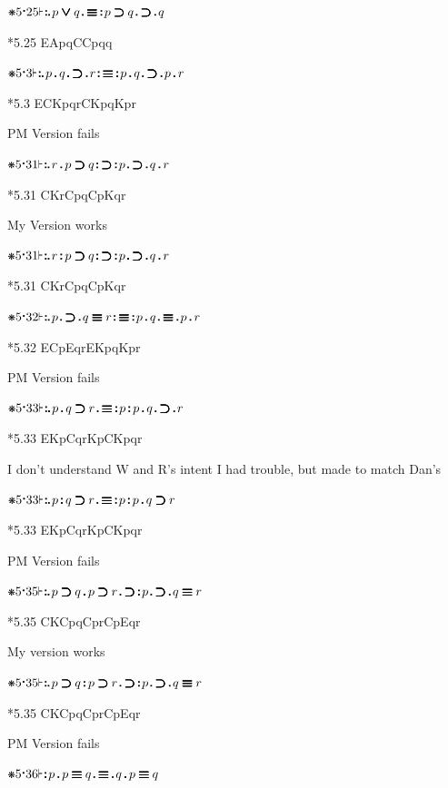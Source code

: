 \documentclass[12pt]{article}
\newcommand{\pmthm}{\mathpunct{\text{\scalebox{.5}[1]{$\boldsymbol\vdash$}}}} %
\newcommand{\pmast}{\text{\resizebox{!}{.75\height}{\ding{107}}}} %
\newcommand{\pmcdot}{\text{\raisebox{.05cm}{$\boldsymbol\cdot$}}} %
\newcommand{\pmd}{\hbox{\rule{.3ex}{.3ex}}} %
\newcommand{\pmdd}{\overset{\pmd}{\pmd}} %
\newcommand{\pmdot}{\mathinner{\pmd}}
\newcommand{\pmdott}{\mathinner{\pmdd}}
\newcommand{\pmdottt}{\mathinner{\pmdd\hspace{1pt}\pmd}}
\newcommand{\pmor}{\mathbin{\ooalign{$\boldsymbol{\vee}\mkern.5mu$\hidewidth\cr$\boldsymbol{\vee}$\cr\hidewidth$\mkern.5mu\boldsymbol{\vee}$}}}
\newcommand{\pmimp}{\mathbin{\ooalign{$\boldsymbol{\supset}\mkern.5mu$\hidewidth\cr$\boldsymbol{\supset}$\cr\hidewidth$\mkern.5mu\boldsymbol{\supset}$}}} %
\newcommand{\pmand}{\mathbin{\pmd}}%
\newcommand{\pmandd}{\mathbin{\pmdd}}
\newcommand{\pmiff}{\mathbin{\ooalign{$\boldsymbol{\equiv}\mkern.5mu$\hidewidth\cr$\boldsymbol{\equiv}$\cr\hidewidth$\mkern.5mu\boldsymbol{\equiv}$}}} %
\begin{document}
$\pmast 5 \pmcdot 25 \pmthm \pmdottt p \pmor q \pmdot \pmiff \pmdott p \pmimp q \pmdot \pmimp \pmdot q  $ 

*5.25 EApqCCpqq

$\pmast 5 \pmcdot 3 \pmthm \pmdottt p \pmand q \pmdot \pmimp \pmdot r \pmdott \pmiff \pmdott p \pmand q \pmdot \pmimp \pmdot p \pmand r   $

*5.3 ECKpqrCKpqKpr

PM Version fails

$\pmast 5 \pmcdot 31 \pmthm \pmdottt r \pmand p \pmimp q \pmdott \pmimp \pmdott p \pmdot \pmimp \pmdot q \pmand r   $

*5.31 CKrCpqCpKqr

My Version works

$\pmast 5 \pmcdot 31 \pmthm \pmdottt r \pmandd p \pmimp q \pmdott \pmimp \pmdott p \pmdot \pmimp \pmdot q \pmand r   $

*5.31 CKrCpqCpKqr

$\pmast 5 \pmcdot 32 \pmthm \pmdottt p \pmdot \pmimp \pmdot q \pmiff r \pmdott \pmiff \pmdott p \pmand q \pmdot \pmiff \pmdot p \pmand r $

*5.32 ECpEqrEKpqKpr

PM Version fails

$\pmast 5 \pmcdot 33 \pmthm \pmdottt p \pmand q \pmimp r \pmdot \pmiff \pmdott p \pmandd p \pmand q \pmdot \pmimp \pmdot r $

*5.33 EKpCqrKpCKpqr

I don't understand W and R's intent
I had trouble, but made to match Dan's

$\pmast 5 \pmcdot 33 \pmthm \pmdottt p \pmandd q \pmimp r \pmdot \pmiff \pmdott p \pmandd p \pmand q \pmimp r    $

*5.33 EKpCqrKpCKpqr

PM Version fails

$\pmast 5 \pmcdot 35 \pmthm \pmdottt p \pmimp q \pmand p \pmimp r \pmdot \pmimp \pmdott p \pmdot \pmimp \pmdot q \pmiff r    $


*5.35 CKCpqCprCpEqr

My version works

$\pmast 5 \pmcdot 35 \pmthm \pmdottt p \pmimp q \pmandd p \pmimp r \pmdot \pmimp \pmdott p \pmdot \pmimp \pmdot q \pmiff r    $


*5.35 CKCpqCprCpEqr


PM Version fails

$\pmast 5 \pmcdot 36 \pmthm \pmdott p \pmand p \pmiff q \pmdot \pmiff \pmdot q \pmand p \pmiff q  $
\end{document}

